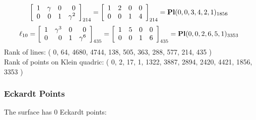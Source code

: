 \documentclass{article}
\begin{document}
{$$\left[
\begin{array}{*{4}{r}}
1 & \gamma  & 0 & 0\\
0 & 0 & 1 & \gamma^{2}\\
\end{array}
\right]
_{214}
=
\left[
\begin{array}{*{4}c}
1  & 2  & 0  & 0\\
0  & 0  & 1  & 4\\
\end{array}
\right]_{214}
={\rm\bf Pl}(0,0,3,4,2,1 )_{1856}$$
$$
\ell_{10} = 
\left[
\begin{array}{*{4}{r}}
1 & \gamma^{3} & 0 & 0\\
0 & 0 & 1 & \gamma^{6}\\
\end{array}
\right]
_{435}
=
\left[
\begin{array}{*{4}c}
1  & 5  & 0  & 0\\
0  & 0  & 1  & 6\\
\end{array}
\right]_{435}
={\rm\bf Pl}(0,0,2,6,5,1 )_{3353}$$
Rank of lines: ( 0, 64, 4680, 4744, 138, 505, 363, 288, 577, 214, 435 )\\
Rank of points on Klein quadric: ( 0, 2, 17, 1, 1322, 3887, 2894, 2420, 4421, 1856, 3353 )\\
\subsubsection*{Eckardt Points}
The surface has 0 Eckardt points:\\
}
\end{document}
